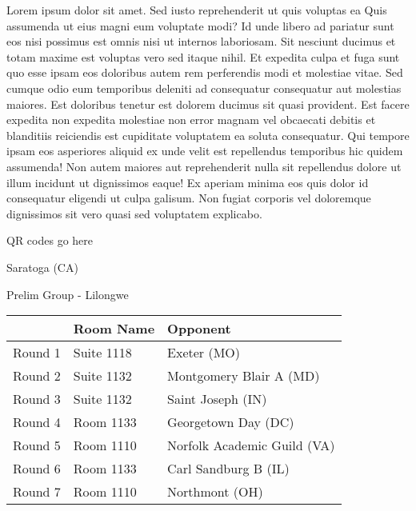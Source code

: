 \documentclass{article}%
\begin{document}
\vspace*{8pt}%
\linebreak%
\newline%
\newline%
Lorem ipsum dolor sit amet. Sed iusto reprehenderit ut quis voluptas ea Quis assumenda ut eius magni eum voluptate modi? Id unde libero ad pariatur sunt eos nisi possimus est omnis nisi ut internos laboriosam. Sit nesciunt ducimus et totam maxime est voluptas vero sed itaque nihil. Et expedita culpa et fuga sunt quo esse ipsam eos doloribus autem rem perferendis modi et molestiae vitae.\newline%
\newline%
Sed cumque odio eum temporibus deleniti ad consequatur consequatur aut molestias maiores. Est doloribus tenetur est dolorem ducimus sit quasi provident. Est facere expedita non expedita molestiae non error magnam vel obcaecati debitis et blanditiis reiciendis est cupiditate voluptatem ea soluta consequatur. Qui tempore ipsam eos asperiores aliquid ex unde velit est repellendus temporibus hic quidem assumenda!\newline%
\newline%
Non autem maiores aut reprehenderit nulla sit repellendus dolore ut illum incidunt ut dignissimos eaque! Ex aperiam minima eos quis dolor id consequatur eligendi ut culpa galisum. Non fugiat corporis vel doloremque dignissimos sit vero quasi sed voluptatem explicabo.\newline%
\newline%
%
\vspace*{30pt}%
\begin{center}%
\begin{Huge}%
QR codes go here%
\end{Huge}%
\end{center}%
\newpage%
%
\begin{center}%
\begin{Huge}%
Saratoga (CA)%
\end{Huge}%
\vspace*{8pt}%
\linebreak%
\begin{Large}%
Prelim Group {-} Lilongwe%
\end{Large}%
\end{center}%
\begin{tabularx}{\textwidth}{|c|Y|Y|}%
\hline%
&Room Name&Opponent\\%
\hline%
Round 1&Suite 1118&Exeter (MO)\\%
Round 2&Suite 1132&Montgomery Blair A (MD)\\%
Round 3&Suite 1132&Saint Joseph (IN)\\%
Round 4&Room 1133&Georgetown Day (DC)\\%
Round 5&Room 1110&Norfolk Academic Guild (VA)\\%
Round 6&Room 1133&Carl Sandburg B (IL)\\%
Round 7&Room 1110&Northmont (OH)\\%
\hline%
\end{tabularx}%
\end{document}
